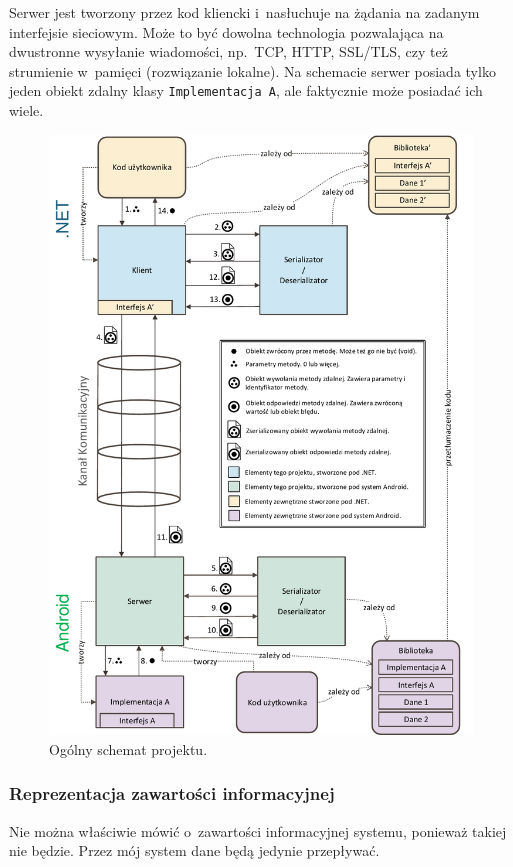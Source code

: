 Serwer jest tworzony przez kod kliencki i~nasłuchuje na żądania na zadanym interfejsie sieciowym. Może to być dowolna technologia pozwalająca na dwustronne wysyłanie wiadomości, np.\ TCP, HTTP, SSL/TLS, czy też strumienie w~pamięci (rozwiązanie lokalne).
Na schemacie serwer posiada tylko jeden obiekt zdalny klasy \texttt{Implementacja A}, ale faktycznie może posiadać ich wiele.

\begin{figure}
  \advance\leftskip-1.5cm
	\includegraphics[scale=0.8]{img/schematy/schemat-dzialania-magisterki.pdf}
	\caption{Ogólny schemat projektu.}
	\label{fig:project-overview}
\end{figure}


\subsubsection{Reprezentacja zawartości informacyjnej}
Nie można właściwie mówić o~zawartości informacyjnej systemu, ponieważ takiej nie będzie.
Przez mój system dane będą jedynie przepływać.


